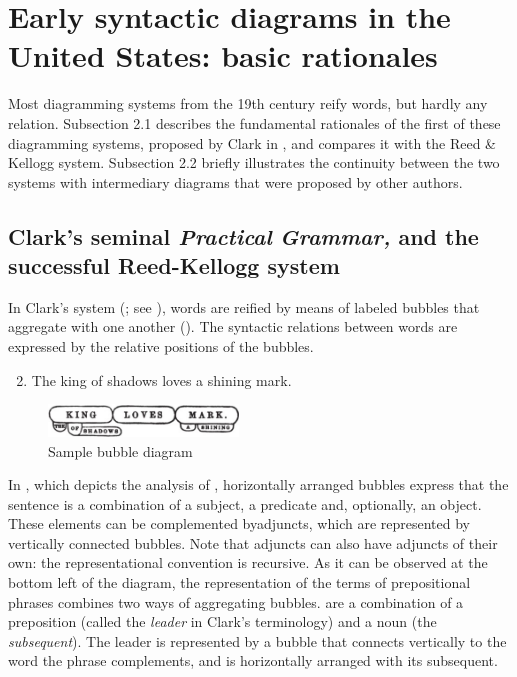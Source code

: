 \documentclass[output=paper]{langsci/langscibook}
\begin{document}
\section{Early syntactic diagrams in the United States: basic rationales}

Most diagramming systems from the 19th century reify words, but hardly any relation. Subsection 2.1 describes the fundamental rationales of the first of these diagramming systems, proposed by Clark in \citeyear{clark_science_1847}, and compares it with the Reed \& Kellogg system. Subsection 2.2 briefly illustrates the continuity between the two systems with intermediary diagrams that were proposed by other authors.

\subsection{Clark’s seminal \textit{Practical} \textit{Grammar,} and the successful Reed-Kellogg system}

In Clark’s system (\citeyear{clark_science_1847}; see \citealt{mazziotta_drawing_2016}), words are reified by means of labeled bubbles that aggregate with one another (). The syntactic relations between words are expressed by the relative positions of the bubbles. 

\ea%
    \label{ex:key:2}
\begin{enumerate} \setcounter{enumi}{1}

    \item The king of shadows loves a shining mark. \centering
\end{enumerate}
  
\begin{figure}
    \centering
    \includegraphics[width=0.45\textwidth]{figures/04/Kap.4.img.0003.jpg}
    \caption{Sample bubble diagram \citep[23]{clark_science_1847} }
    \label{fig:3}
\end{figure}

In , which depicts the analysis of , horizontally arranged bubbles express that the sentence is a combination of a  subject, a predicate and, optionally, an object. These elements can be complemented byadjuncts, which are represented by vertically connected bubbles. Note that adjuncts can also have adjuncts of their own: the representational convention is recursive. As it can be observed at the bottom left of the diagram, the representation of the terms of prepositional phrases combines two ways of aggregating bubbles.  are a combination of a preposition (called the \textit{leader} in Clark’s terminology) and a noun (the \textit{subsequent}). The leader is represented by a bubble that connects vertically to the word the phrase complements, and is horizontally arranged with its subsequent.
\end{document}
